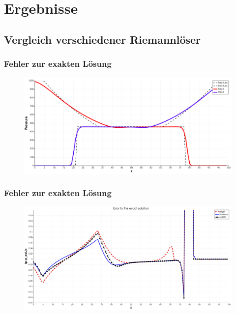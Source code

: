 \documentclass[
	11pt, %
	aspectratio=169, %
]{beamer}
\begin{document}
\section{Ergebnisse}

\subsection{Vergleich verschiedener Riemannlöser}
\begin{frame}
	\frametitle{Fehler zur exakten Lösung}
	\begin{figure}
		\includegraphics[width=0.9\linewidth]{Toro3Toro4.png}
	\end{figure}
	

\end{frame}


\begin{frame}
	\frametitle{Fehler zur exakten Lösung}
	\begin{figure}
		\includegraphics[width=0.9\linewidth]{ErrorToExactSolution_God_Steger_AUSMD_transparent.png}
	\end{figure}
	

\end{frame}
\end{document}
